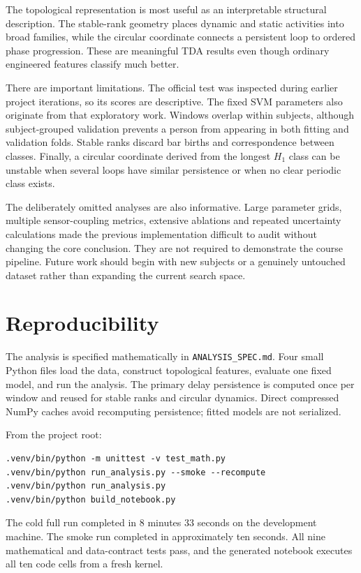 \documentclass[11pt,a4paper]{article}
\begin{document}
The topological representation is most useful as an interpretable structural description. The stable-rank geometry places dynamic and static activities into broad families, while the circular coordinate connects a persistent loop to ordered phase progression. These are meaningful TDA results even though ordinary engineered features classify much better.

There are important limitations. The official test was inspected during earlier project iterations, so its scores are descriptive. The fixed SVM parameters also originate from that exploratory work. Windows overlap within subjects, although subject-grouped validation prevents a person from appearing in both fitting and validation folds. Stable ranks discard bar births and correspondence between classes. Finally, a circular coordinate derived from the longest $H_1$ class can be unstable when several loops have similar persistence or when no clear periodic class exists.

The deliberately omitted analyses are also informative. Large parameter grids, multiple sensor-coupling metrics, extensive ablations and repeated uncertainty calculations made the previous implementation difficult to audit without changing the core conclusion. They are not required to demonstrate the course pipeline. Future work should begin with new subjects or a genuinely untouched dataset rather than expanding the current search space.

\section{Reproducibility}

The analysis is specified mathematically in \texttt{ANALYSIS\_SPEC.md}. Four small Python files load the data, construct topological features, evaluate one fixed model, and run the analysis. The primary delay persistence is computed once per window and reused for stable ranks and circular dynamics. Direct compressed NumPy caches avoid recomputing persistence; fitted models are not serialized.

From the project root:
\begin{verbatim}
.venv/bin/python -m unittest -v test_math.py
.venv/bin/python run_analysis.py --smoke --recompute
.venv/bin/python run_analysis.py
.venv/bin/python build_notebook.py
\end{verbatim}

The cold full run completed in 8 minutes 33 seconds on the development machine. The smoke run completed in approximately ten seconds. All nine mathematical and data-contract tests pass, and the generated notebook executes all ten code cells from a fresh kernel.
\end{document}
